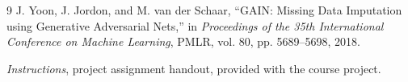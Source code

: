 \documentclass[11pt]{article}
\begin{document}
\begin{thebibliography}{9}
J. Yoon, J. Jordon, and M. van der Schaar,
\newblock ``GAIN: Missing Data Imputation using Generative Adversarial Nets,''
\newblock in \emph{Proceedings of the 35th International Conference on Machine Learning}, PMLR, vol. 80, pp. 5689--5698, 2018.

\newblock \emph{Instructions}, project assignment handout, provided with the course project.
\end{thebibliography}
\end{document}

